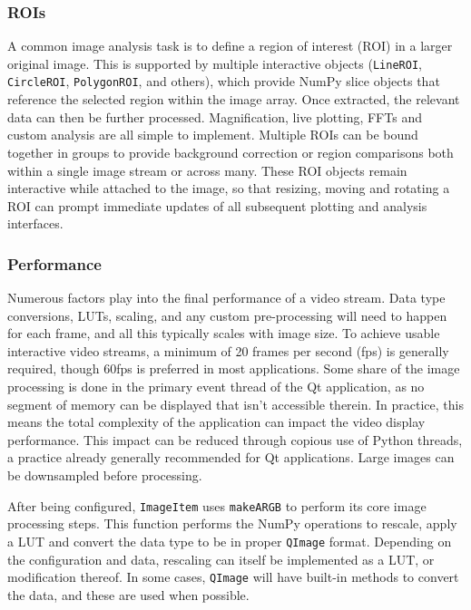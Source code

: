 \documentclass[journal]{vgtc}                %
\begin{document}
\subsubsection{ROIs}

A common image analysis task is to define a region of interest (ROI) in a larger original image. This is supported by multiple interactive objects (\texttt{LineROI}, \texttt{CircleROI}, \texttt{PolygonROI}, and others), which provide NumPy slice objects that reference the selected region within the image array. Once extracted, the relevant data can then be further processed. Magnification, live plotting, FFTs and custom analysis are all simple to implement. Multiple ROIs can be bound together in groups to provide background correction or region comparisons both within a single image stream or across many. These ROI objects remain interactive while attached to the image, so that resizing, moving and rotating a ROI can prompt immediate updates of all subsequent plotting and analysis interfaces.

\subsubsection{Performance}

Numerous factors play into the final performance of a video stream. Data type conversions, LUTs, scaling, and any custom pre-processing will need to happen for each frame, and all this typically scales with image size. To achieve usable interactive video streams, a minimum of 20 frames per second (fps) is generally required, though 60fps is preferred in most applications. Some share of the image processing is done in the primary event thread of the Qt application, as no segment of memory can be displayed that isn't accessible therein. In practice, this means the total complexity of the application can impact the video display performance. This impact can be reduced through copious use of Python threads, a practice already generally recommended for Qt applications. Large images can be downsampled before processing.

After being configured, \texttt{ImageItem} uses \texttt{makeARGB} to perform its core image processing steps. This function performs the NumPy operations to rescale, apply a LUT and convert the data type to be in proper \texttt{QImage} format. Depending on the configuration and data, rescaling can itself be implemented as a LUT, or modification thereof. In some cases, \texttt{QImage} will have built-in methods to convert the data, and these are used when possible.
\end{document}
